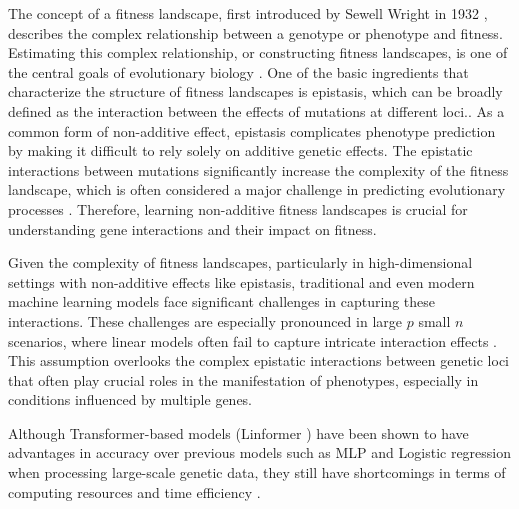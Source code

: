 \documentclass{article}
\begin{document}
The concept of a fitness landscape, first introduced by Sewell Wright in 1932 \parencite{wright1932roles}, describes the complex relationship between a genotype or phenotype and fitness. Estimating this complex relationship, or constructing fitness landscapes, is one of the central goals of evolutionary biology \parencite{patton2022hybridization}. One of the basic ingredients that characterize the structure of fitness landscapes is epistasis, which can be broadly defined as the interaction between the effects of mutations at different loci.\parencite {ferretti2016measuring}. As a common form of non-additive effect, epistasis complicates phenotype prediction by making it difficult to rely solely on additive genetic effects. The epistatic interactions between mutations significantly increase the complexity of the fitness landscape, which is often considered a major challenge in predicting evolutionary processes \parencite{diaz2023global}. Therefore, learning non-additive fitness landscapes is crucial for understanding gene interactions and their impact on fitness.


Given the complexity of fitness landscapes, particularly in high-dimensional settings with non-additive effects like epistasis, traditional and even modern machine learning models face significant challenges in capturing these interactions. These challenges are especially pronounced in large $p$ small $n$ scenarios, where linear models often fail to capture intricate interaction effects \parencite{eichler2010missing}. This assumption overlooks the complex epistatic interactions between genetic loci that often play crucial roles in the manifestation of phenotypes, especially in conditions influenced by multiple genes.


Although Transformer-based models (Linformer \parencite{wang2020linformer}) have been shown to have advantages in accuracy over previous models such as MLP and Logistic regression when processing large-scale genetic data, they still have shortcomings in terms of computing resources and time efficiency \parencite{kieransimulatepaper}. 


\end{document}
